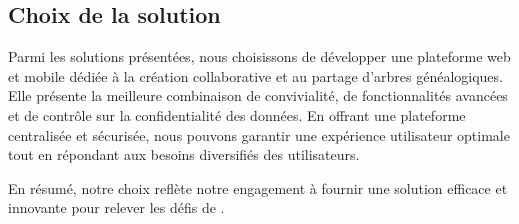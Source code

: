 \subsection{Choix de la solution}
Parmi les solutions présentées, nous choisissons de développer une plateforme web
et mobile dédiée à la création collaborative et au partage d’arbres généalogiques.
Elle présente la meilleure combinaison de convivialité, de fonctionnalités avancées
et de contrôle sur la confidentialité des données. En offrant une plateforme
centralisée et sécurisée, nous pouvons garantir une expérience utilisateur optimale
tout en répondant aux besoins diversifiés des utilisateurs.

En résumé, notre choix reflète notre engagement à fournir une solution
efficace et innovante pour relever les défis de \firm.

